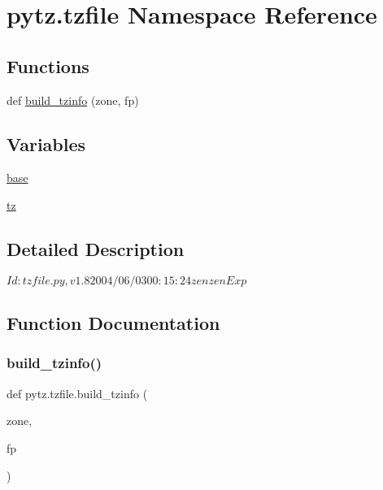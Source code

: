 \hypertarget{namespacepytz_1_1tzfile}{}\section{pytz.\+tzfile Namespace Reference}
\label{namespacepytz_1_1tzfile}
\subsection*{Functions}
\begin{DoxyCompactItemize}
\item 
def \hyperlink{namespacepytz_1_1tzfile_a600e9e070b4abb3e44b05e6c2dc9f05c}{build\+\_\+tzinfo} (zone, fp)
\end{DoxyCompactItemize}
\subsection*{Variables}
\begin{DoxyCompactItemize}
\item 
\hyperlink{namespacepytz_1_1tzfile_a1e04473fa115b32fccc5130ab2ded2ba}{base}
\item 
\hyperlink{namespacepytz_1_1tzfile_ade90bcf778afffc34448fdfce8a7a408}{tz}
\end{DoxyCompactItemize}


\subsection{Detailed Description}
\begin{DoxyVerb}$Id: tzfile.py,v 1.8 2004/06/03 00:15:24 zenzen Exp $
\end{DoxyVerb}
 

\subsection{Function Documentation}
\mbox{\label{namespacepytz_1_1tzfile_a600e9e070b4abb3e44b05e6c2dc9f05c}} 
\subsubsection{\texorpdfstring{build\+\_\+tzinfo()}{build\_tzinfo()}}
{\footnotesize\ttfamily def pytz.\+tzfile.\+build\+\_\+tzinfo (\begin{DoxyParamCaption}\item[{}]{zone,  }\item[{}]{fp }\end{DoxyParamCaption})}




